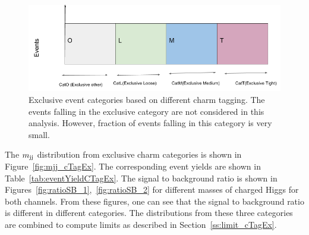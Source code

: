 \begin{figure}
\begin{center}
\includegraphics[width=1.00\textwidth]{Image/Limit/cTagCat.png}
\caption{Exclusive event categories based on different charm tagging. The events falling
in the exclusive  category are not considered in this analysis. However, fraction of
events falling in this category is very small.}
\label{fig:cTagCat}
\end{center}
\end{figure}
The $m_\text{jj}$ distribution from exclusive charm categories is shown in 
Figure~\ref{fig:mjj_cTagEx}. The corresponding event yields are shown in 
Table~\ref{tab:eventYieldCTagEx}. The signal to background ratio is 
shown in Figures~\ref{fig:ratioSB_1},~\ref{fig:ratioSB_2} for different masses 
of charged Higgs for both channels. From these figures, one can see that the 
signal to background ratio is different in different categories. The \mjj distributions
from these three categories are combined to compute limits as described in 
Section~\ref{ss:limit_cTagEx}.
